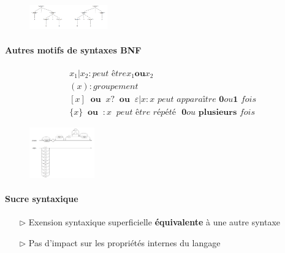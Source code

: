 \documentclass{report}
\begin{document}
\begin{multicols*}{3}
    \begin{figure}[H]
        \begin{center}
            \includegraphics[width=0.30\textwidth]{GrammaireAmbig}
        \end{center}
    \end{figure}

    \paragraph{Autres motifs de syntaxes BNF}
    \begin{align*}
        &x_1 | x_2 : \textit{peut être} x_1 \textbf{ou} x_2 \\ 
        &(x) : \textit{groupement} \\ 
        &[x] \;\; \textbf{ou} \;\; x? \;\; \textbf{ou} \;\; \varepsilon| x : 
        x \textit{ peut apparaître  } \textbf{0} ou \textbf{1} \textit{ fois} \\
        &\{x\} \;\; \textbf{ou} \;\; : x \;\; \textit{peut être répété } \textbf{ 0} \textit{ou} \textbf{ plusieurs} \textit{ fois}         
    \end{align*}

    \begin{figure}[H]
        \begin{center}
            \includegraphics[width=0.25\textwidth]{diagrammesyntaxique}
        \end{center}
    \end{figure}

    \paragraph{Sucre syntaxique}
    \begin{itemize}
        \item [$\rhd$ ] Exension syntaxique superficielle \textbf{équivalente} à 
            une autre syntaxe 
        \item [$\rhd$ ] Pas d'impact sur les propriétés internes du langage
    \end{itemize}


\end{multicols*}
\end{document}

